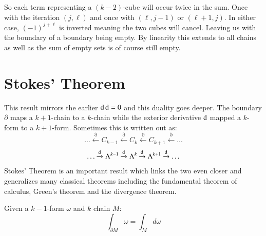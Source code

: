 So each term representing a $(k-2)$-cube will occur twice in the sum.
Once with the iteration $(j,\ell)$ and once with $(\ell, j-1)$ or $(\ell+1, j)$.
In either case, $(-1)^{j+\ell}$ is inverted meaning the two cubes will cancel.
Leaving us with the boundary of a boundary being empty.
By linearity this extends to all chains as well as the sum of empty sets is of course still empty.





%
%
\section{Stokes' Theorem}


This result mirrors the earlier $\mathop{}\!\mathrm{d} \mathop{}\!\mathrm{d} = 0$ and this duality goes deeper.
The boundary $\partial$ maps a $k+1$-chain to a $k$-chain while 
the exterior derivative $\mathop{}\!\mathrm{d}$ mapped a $k$-form to a $k+1$-form.
Sometimes this is written out as:
\begin{equation*}
	\ldots 	\xleftarrow{\partial} C_{k-1} 
			\xleftarrow{\partial} C_k 
			\xleftarrow{\partial} C_{k+1} 
			\xleftarrow{\partial} \ldots
\end{equation*}
\begin{equation*}
	\ldots 	\xrightarrow{\mathop{}\!\mathrm{d}} \Lambda^{k-1} 
			\xrightarrow{\mathop{}\!\mathrm{d}} \Lambda^k 
			\xrightarrow{\mathop{}\!\mathrm{d}} \Lambda^{k+1} 
			\xrightarrow{\mathop{}\!\mathrm{d}} \ldots
\end{equation*}
Stokes' Theorem is an important result which links the two even closer and generalizes many classical theorems including
the fundamental theorem of calculus, Green's theorem and the divergence theorem.


Given a $k-1$-form $\omega$ and $k$ chain $M$:
\begin{equation}
	\tag{Stokes' Theorem}
	\int_{\partial M} \omega = \int_M d\omega
\end{equation}


